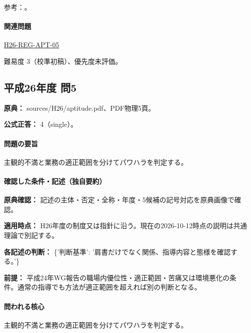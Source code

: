 \par 参考：\cite{employment_power2012,employment_power_current}。

\paragraph{関連問題} \hyperref[q:h26-reg-apt-05]{H26-REG-APT-05}

\par 難易度 3（校準初稿）、優先度未評価。

\subsection{平成26年度 問5}
\label{q:h26-reg-apt-05}

\noindent\textbf{原典：} sources/H26/aptitude.pdf、PDF物理5頁。

\textbf{公式正答：} 4（single）。

\paragraph{問題の要旨} 主観的不満と業務の適正範囲を分けてパワハラを判定する。

\paragraph{確認した条件・記述（独自要約）}\mbox{}\par

\noindent\textbf{原典確認：} 記述の主体・否定・全称・年度・5候補の記号対応を原典画像で確認。\par

\noindent\textbf{適用時点：} H26年度の制度又は指針に沿う。現在の2026-10-12時点の説明は共通理論で別記する。\par

\noindent\textbf{各記述の判断：} \{'判断基準': '肩書だけでなく関係、指導内容と態様を確認する。'\}\par

\noindent\textbf{前提：} 平成24年WG報告の職場内優位性・適正範囲・苦痛又は環境悪化の条件。通常の指導でも方法が適正範囲を超えれば別の判断となる。\par

\paragraph{問われる核心} 主観的不満と業務の適正範囲を分けてパワハラを判定する。

